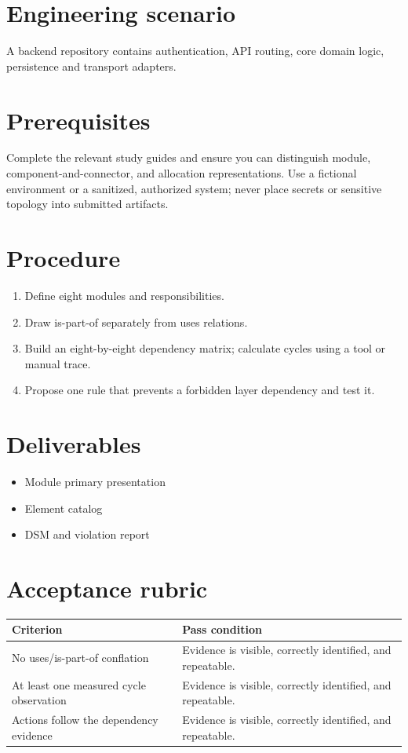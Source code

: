 \documentclass[10pt,letterpaper]{article}
\begin{document}
\DocProvenance
\section{Engineering scenario}
A backend repository contains authentication, API routing, core domain logic, persistence and transport adapters.

\section{Prerequisites}
Complete the relevant study guides and ensure you can distinguish module, component-and-connector, and allocation representations. Use a fictional environment or a sanitized, authorized system; never place secrets or sensitive topology into submitted artifacts.

\section{Procedure}
\begin{enumerate}
\item Define eight modules and responsibilities.
\item Draw is-part-of separately from uses relations.
\item Build an eight-by-eight dependency matrix; calculate cycles using a tool or manual trace.
\item Propose one rule that prevents a forbidden layer dependency and test it.
\end{enumerate}
\section{Deliverables}
\begin{itemize}
\item Module primary presentation
\item Element catalog
\item DSM and violation report
\end{itemize}
\section{Acceptance rubric}
\small
\begin{tabularx}{\linewidth}{@{}YY@{}}
\toprule
\textbf{Criterion} & \textbf{Pass condition} \\
\midrule
No uses/is-part-of conflation & Evidence is visible, correctly identified, and repeatable. \\
At least one measured cycle observation & Evidence is visible, correctly identified, and repeatable. \\
Actions follow the dependency evidence & Evidence is visible, correctly identified, and repeatable. \\
\bottomrule
\end{tabularx}
\normalsize
\end{document}
